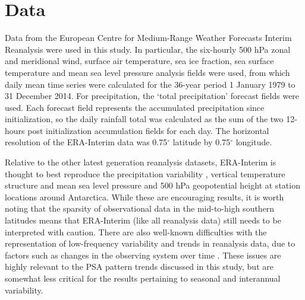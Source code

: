 \section{Data}

Data from the European Centre for Medium-Range Weather Forecasts Interim Reanalysis \citep[ERA-Interim;][]{Dee2011} were used in this study. In particular, the six-hourly 500 hPa zonal and meridional wind, surface air temperature, sea ice fraction, sea surface temperature and mean sea level pressure analysis fields were used, from which daily mean time series were calculated for the 36-year period 1 January 1979 to 31 December 2014. For precipitation, the `total precipitation' forecast fields were used. Each forecast field represents the accumulated precipitation since initialization, so the daily rainfall total was calculated as the sum of the two 12-hours post initialization accumulation fields for each day. The horizontal resolution of the ERA-Interim data was 0.75$^{\circ}$ latitude by 0.75$^{\circ}$ longitude.  

Relative to the other latest generation reanalysis datasets, ERA-Interim is thought to best reproduce the precipitation variability \citep{Bromwich2011,Nicolas2011}, vertical temperature structure \citep{Screen2012} and mean sea level pressure and 500 hPa geopotential height at station locations \citep{Bracegirdle2012} around Antarctica. While these are encouraging results, it is worth noting that the sparsity of observational data in the mid-to-high southern latitudes means that ERA-Interim (like all reanalysis data) still needs to be interpreted with caution. There are also well-known difficulties with the representation of low-frequency variability and trends in reanalysis data, due to factors such as changes in the observing system over time \citep{Dee2014}. These issues are highly relevant to the PSA pattern trends discussed in this study, but are somewhat less critical for the results pertaining to seasonal and interannual variability.
